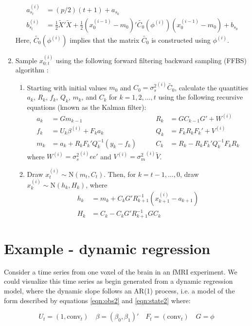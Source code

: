 \documentclass{article}
\begin{document}
\begin{enumerate}
\begin{align*}
a_{s_t}^{(i)} &= (p/2)(t+1) + a_{s_0} \\
b_{s_t}^{(i)} &= \frac{1}{2}\tilde{X}'\tilde{X} + \frac{1}{2}(x_0^{(i-1)}-m_0)'\tilde{C_0}(\phi^{(i)})(x_0^{(i-1)}-m_0) + b_{s_0}
\end{align*}
\noindent Here, $\tilde{C_0}(\phi^{(i)})$ implies that the matrix $\tilde{C_0}$ is constructed using $\phi^{(i)}$.
\item Sample $x_{0:t}^{(i)}$ using the following forward filtering backward sampling (FFBS) algorithm \citep{petris2009dynamic}:
\begin{enumerate}
\item Starting with initial values $m_0$ and $C_0 = {\sigma^2_s}^{(i)}\tilde{C_0}$, calculate the quantities $a_k$, $R_k$, $f_k$, $Q_k$, $m_k$, and $C_k$ for $k = 1,2,\ldots,t$ using the following recursive equations (known as the Kalman filter):
    \begin{align*}
    a_k &= Gm_{k-1} &\qquad R_k &= GC_{k-1}G' + W^{(i)} \\
    f_k &= U_k\beta^{(i)} + F_ka_k &\qquad Q_k &= F_kR_kF_k' + V^{(i)} \\
    m_k &= a_k + R_kF_k'Q_k^{-1}(y_k-f_k) &\qquad C_k &= R_k - R_kF_k'Q_k^{-1}F_kR_k
    \end{align*}
    \noindent where $W^{(i)} = {\sigma^2_s}^{(i)}ee'$ and $V^{(i)} = {\sigma^2_m}^{(i)}\tilde{V}$.
\item Draw $x_t^{(i)} \sim \mbox{N}(m_t,C_t)$. Then, for $k = t-1,\ldots,0$, draw $x_k^{(i)} \sim \mbox{N}(h_k,H_k)$, where
    \begin{align*}
    h_k &= m_k + C_kG'R_{k+1}^{-1}(x_{k+1}^{(i)} - a_{k+1}) \\
    H_k &= C_k - C_kG'R_{k+1}^{-1}GC_k
    \end{align*}
\end{enumerate}
\end{enumerate}

\section{Example - dynamic regression} \label{sec:exdr}

Consider a time series from one voxel of the brain in an fMRI experiment. We could visualize this time series as begin generated from a dynamic regression model, where the dynamic slope follows an AR(1) process, i.e. a model of the form described by equations \eqref{eqn:obs2} and \eqref{eqn:state2} where:

\begin{equation}
U_t = (1, \mbox{conv}_t) \quad \beta = (\beta_0,\beta_1)' \quad F_t = (\mbox{conv}_t) \quad G = \phi \label{eqn:dr}
\end{equation}
\end{document}
